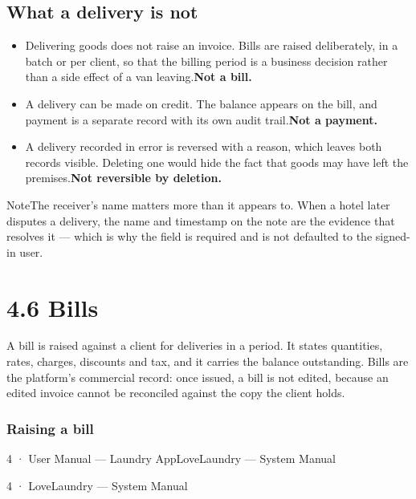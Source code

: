 \documentclass[11pt,a4paper,oneside]{book}
\begin{document}
\subsection*{What a delivery is not}
\begin{itemize}
\item Delivering goods does not raise an invoice. Bills are raised deliberately, in a batch or per client, so that the billing period is a business decision rather than a side effect of a van leaving.\textbf{Not a bill.}
\item A delivery can be made on credit. The balance appears on the bill, and payment is a separate record with its own audit trail.\textbf{Not a payment.}
\item A delivery recorded in error is reversed with a reason, which leaves both records visible. Deleting one would hide the fact that goods may have left the premises.\textbf{Not reversible by deletion.}
\end{itemize}
\begin{notebox}NoteThe receiver's name matters more than it appears to. When a hotel later disputes a delivery, the name and timestamp on the note are the evidence that resolves it — which is why the field is required and is not defaulted to the signed-in user.\end{notebox}
\section{4.6 Bills}
A bill is raised against a client for deliveries in a period. It states quantities, rates, charges, discounts and tax, and it carries the balance outstanding. Bills are the platform's commercial record: once issued, a bill is not edited, because an edited invoice cannot be reconciled against the copy the client holds.

\subsubsection*{Raising a bill}
4 · User Manual — Laundry AppLoveLaundry — System Manual

4 · LoveLaundry — System Manual
\end{document}
